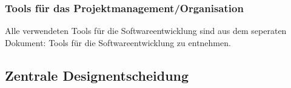 \documentclass[a4paper,11pt]{scrartcl}
\begin{document}
		\subsubsection{Tools für das Projektmanagement/Organisation}
Alle verwendeten Tools für die Softwareentwicklung sind aus dem seperaten Dokument: \glqq Tools für die Softwareentwicklung\grqq{} zu entnehmen.

	\subsection{Zentrale Designentscheidung}



\end{document}
